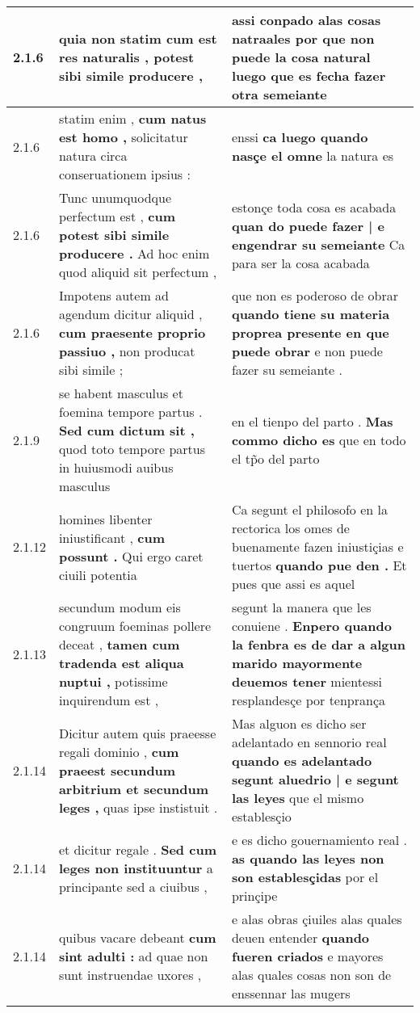 \begin{tabular}{|p{1cm}|p{6.5cm}|p{6.5cm}|}
2.1.6 & quia non statim \textbf{ cum est res naturalis , } potest sibi simile producere , & assi conpado alas cosas natraales \textbf{ por que non puede la cosa natural } luego que es fecha fazer otra semeiante \\\hline
2.1.6 & statim enim , \textbf{ cum natus est homo , } solicitatur natura circa conseruationem ipsius : & enssi \textbf{ ca luego quando nasçe el omne } la natura es \\\hline
2.1.6 & Tunc unumquodque perfectum est , \textbf{ cum potest sibi simile producere . } Ad hoc enim quod aliquid sit perfectum , & estonçe toda cosa es acabada \textbf{ quan do puede fazer | e engendrar su semeiante } Ca para ser la cosa acabada \\\hline
2.1.6 & Impotens autem ad agendum dicitur aliquid , \textbf{ cum praesente proprio passiuo , } non producat sibi simile ; & que non es poderoso de obrar \textbf{ quando tiene su materia proprea presente en que puede obrar } e non puede fazer su semeiante . \\\hline
2.1.9 & se habent masculus et foemina tempore partus . \textbf{ Sed cum dictum sit , } quod toto tempore partus in huiusmodi auibus masculus & en el tienpo del parto . \textbf{ Mas commo dicho es } que en todo el tp̃o del parto \\\hline
2.1.12 & homines libenter iniustificant , \textbf{ cum possunt . } Qui ergo caret ciuili potentia & Ca segunt el philosofo en la rectorica los omes de buenamente fazen iniustiçias e tuertos \textbf{ quando pue den . } Et pues que assi es aquel \\\hline
2.1.13 & secundum modum eis congruum foeminas pollere deceat , \textbf{ tamen cum tradenda est aliqua nuptui , } potissime inquirendum est , & segunt la manera que les conuiene . \textbf{ Enpero quando la fenbra es de dar a algun marido mayormente deuemos tener } mientessi resplandesçe por tenprança \\\hline
2.1.14 & Dicitur autem quis praeesse regali dominio , \textbf{ cum praeest secundum arbitrium et secundum leges , } quas ipse instistuit . & Mas alguon es dicho ser adelantado en sennorio real \textbf{ quando es adelantado segunt aluedrio | e segunt las leyes } que el mismo establesçio \\\hline
2.1.14 & et dicitur regale . \textbf{ Sed cum leges non instituuntur } a principante sed a ciuibus , & e es dicho gouernamiento real . \textbf{ as quando las leyes non son establesçidas } por el prinçipe \\\hline
2.1.14 & quibus vacare debeant \textbf{ cum sint adulti : } ad quae non sunt instruendae uxores , & e alas obras çiuiles alas quales deuen entender \textbf{ quando fueren criados } e mayores alas quales cosas non son de enssennar las mugers \\\hline

\end{tabular}
